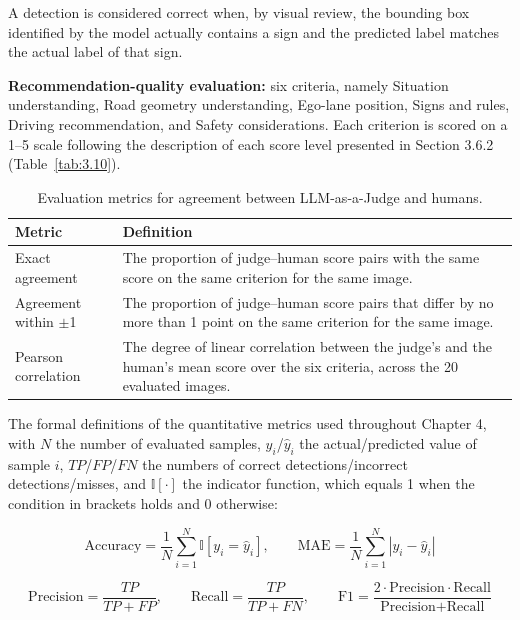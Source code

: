 \documentclass[12pt,a4paper]{report}
\begin{document}
A detection is considered correct when, by visual review, the bounding box identified by the model actually contains a sign and the predicted label matches the actual label of that sign.

\textbf{Recommendation-quality evaluation:} six criteria, namely Situation understanding, Road geometry understanding, Ego-lane position, Signs and rules, Driving recommendation, and Safety considerations. Each criterion is scored on a 1--5 scale following the description of each score level presented in Section 3.6.2 (Table~\ref{tab:3.10}).

\begin{table}[H]
    \centering
    \small
    \renewcommand{\arraystretch}{1.25}
    \caption{Evaluation metrics for agreement between LLM-as-a-Judge and humans.}
    \label{tab:4.4}
    \begin{tabularx}{\linewidth}{
        >{\RaggedRight\arraybackslash}p{3.8cm}
        >{\RaggedRight\arraybackslash}X
    }
        \toprule
        \textbf{Metric} & \textbf{Definition} \\
        \midrule
        Exact agreement & The proportion of judge--human score pairs with the same score on the same criterion for the same image. \\
        Agreement within $\pm$1 & The proportion of judge--human score pairs that differ by no more than 1 point on the same criterion for the same image. \\
        Pearson correlation & The degree of linear correlation between the judge's and the human's mean score over the six criteria, across the 20 evaluated images. \\
        \bottomrule
    \end{tabularx}
\end{table}

The formal definitions of the quantitative metrics used throughout Chapter 4, with $N$ the number of evaluated samples, $y_i$/$\hat{y}_i$ the actual/predicted value of sample $i$, $TP$/$FP$/$FN$ the numbers of correct detections/incorrect detections/misses, and $\mathbb{I}[\cdot]$ the indicator function, which equals 1 when the condition in brackets holds and 0 otherwise:

\[
\text{Accuracy} = \frac{1}{N}\sum_{i=1}^{N} \mathbb{I}[y_i = \hat{y}_i], \qquad \text{MAE} = \frac{1}{N}\sum_{i=1}^{N} |y_i - \hat{y}_i|
\]

\[
\text{Precision} = \frac{TP}{TP + FP}, \qquad \text{Recall} = \frac{TP}{TP + FN}, \qquad \text{F1} = \frac{2 \cdot \text{Precision} \cdot \text{Recall}}{\text{Precision} + \text{Recall}}
\]
\end{document}
